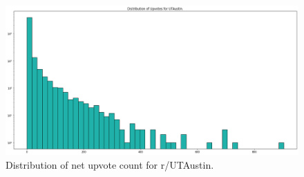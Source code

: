 \documentclass[11pt,a4paper]{article}
\begin{document}
    \begin{figure}[!htb]
        \includegraphics[width=\textwidth]{utaustin_upvotes.png}
        \caption{Distribution of net upvote count for r/UTAustin.}
    \end{figure}
\end{document}
